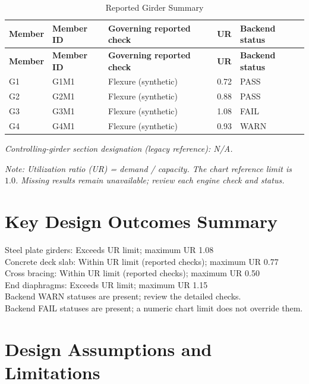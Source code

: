 \documentclass[12pt,a4paper]{report}
\numberwithin{table}{chapter}
\numberwithin{figure}{chapter}
\newcommand{\ReportTableSetup}{%
  \setlength{\tabcolsep}{3.0pt}%
  \renewcommand{\arraystretch}{1.18}%
  \setlength{\arrayrulewidth}{0.4pt}\setlength{\extrarowheight}{0.5pt}%
  \setlength{\LTleft}{\fill}\setlength{\LTright}{\fill}%
  \setlength{\LTpre}{4pt}\setlength{\LTpost}{8pt}}
\newcommand{\ReportTableFont}{\small}
\newcommand{\ReportTableGap}{\vspace{0.5em}}
\begin{document}
\begingroup
\ReportTableSetup
\ReportTableFont
\begin{longtable}{|L{1.8000cm}|L{2.8000cm}|L{6.0000cm}|C{1.6000cm}|C{2.0000cm}|}
\caption{Reported Girder Summary}\\\hline
\textbf{Member} & \textbf{Member ID} & \textbf{Governing reported check} & \textbf{UR} & \textbf{Backend status} \\ \hline
\endfirsthead
\hline
\textbf{Member} & \textbf{Member ID} & \textbf{Governing reported check} & \textbf{UR} & \textbf{Backend status} \\ \hline
\endhead
\hline
\endfoot
\hline
\endlastfoot

G1 & G1M1 & Flexure (synthetic) & 0.72 & PASS \\ \hline
G2 & G2M1 & Flexure (synthetic) & 0.88 & PASS \\ \hline
G3 & G3M1 & Flexure (synthetic) & 1.08 & FAIL \\ \hline
G4 & G4M1 & Flexure (synthetic) & 0.93 & WARN \\ \hline
\end{longtable}
\endgroup
\textit{Controlling-girder section designation (legacy reference): N/A.}

\ReportTableGap
\noindent\textit{Note: Utilization ratio (UR) = demand / capacity. The chart reference limit is $1.0$. Missing results remain unavailable; review each engine check and status.}

\ReportTableGap

\section*{Key Design Outcomes Summary}
\label{sec:key-outcomes}

\noindent Steel plate girders:\allowbreak{} Exceeds UR limit; maximum UR 1.08\\
Concrete deck slab:\allowbreak{} Within UR limit (reported checks); maximum UR 0.77\\
Cross bracing:\allowbreak{} Within UR limit (reported checks); maximum UR 0.50\\
End diaphragms:\allowbreak{} Exceeds UR limit; maximum UR 1.15\\
Backend WARN statuses are present; review the detailed checks.\\
Backend FAIL statuses are present; a numeric chart limit does not override them.

\section*{Design Assumptions and Limitations}
\label{sec:assumptions}
\end{document}

